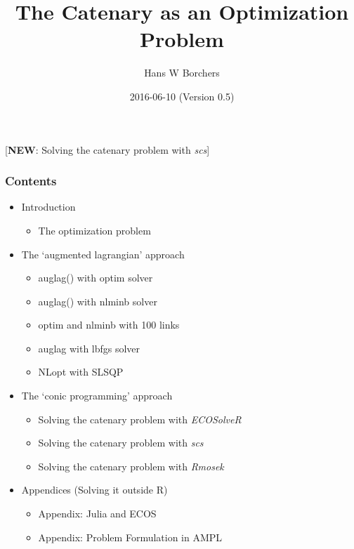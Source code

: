 \documentclass[]{article}
\title{The Catenary as an Optimization Problem}
\author{Hans W Borchers}
\date{2016-06-10 (Version 0.5)}
\providecommand{\tightlist}{%
  \setlength{\itemsep}{0pt}\setlength{\parskip}{0pt}}
\begin{document}
\maketitle

{[}\textbf{NEW}: Solving the catenary problem with \emph{scs}{]}

\subsubsection{Contents}\label{contents}

\begin{itemize}
\tightlist
\item
  Introduction

  \begin{itemize}
  \tightlist
  \item
    The optimization problem
  \end{itemize}
\item
  The `augmented lagrangian' approach

  \begin{itemize}
  \tightlist
  \item
    auglag() with optim solver
  \item
    auglag() with nlminb solver
  \item
    optim and nlminb with 100 links
  \item
    auglag with lbfgs solver
  \item
    NLopt with SLSQP
  \end{itemize}
\item
  The `conic programming' approach

  \begin{itemize}
  \tightlist
  \item
    Solving the catenary problem with \emph{ECOSolveR}
  \item
    Solving the catenary problem with \emph{scs}
  \item
    Solving the catenary problem with \emph{Rmosek}
  \end{itemize}
\item
  Appendices (Solving it outside R)

  \begin{itemize}
  \tightlist
  \item
    Appendix: Julia and ECOS
  \item
    Appendix: Problem Formulation in AMPL
  \end{itemize}
\end{itemize}
\end{document}
